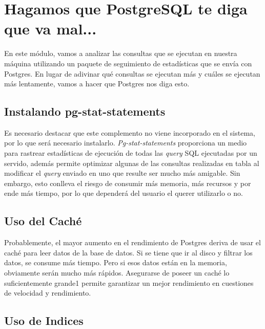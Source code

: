 \documentclass[12pt,conference]{IEEEtran}
\begin{document}
\section{Hagamos que PostgreSQL te diga que va mal...}

En este módulo, vamos a analizar las consultas que se ejecutan en nuestra máquina utilizando un paquete de seguimiento de estadísticas que se envía con Postgres. En lugar de adivinar qué consultas se ejecutan más y cuáles se ejecutan más lentamente, vamos a hacer que Postgres nos diga esto.

\subsection{Instalando pg-stat-statements}
 
Es necesario destacar que este complemento no viene incorporado en el sistema, por lo que será necesario instalarlo. \textit{Pg-stat-statements} proporciona un medio para rastrear estadísticas de ejecución de todas las \textit{query} SQL ejecutadas por un servido, además permite optimizar algunas de las consultas realizadas en tabla al modificar el \textit{query} enviado en uno que resulte ser mucho más amigable. Sin embargo, esto conlleva el riesgo de consumir más memoria, más recursos y por ende más tiempo, por lo que dependerá del usuario el querer utilizarlo o no.

\subsection{Uso del Caché}

Probablemente, el mayor aumento en el rendimiento de Postgres deriva de usar el caché para leer datos de la base de datos. Si se tiene que ir al disco y filtrar los datos, se consume más tiempo. Pero si esos datos están en la memoria, obviamente serán mucho más rápidos. Asegurarse de poseer un caché lo suficientemente grande1 permite garantizar un mejor rendimiento en cuestiones de velocidad y rendimiento.

\subsection{Uso de Indices}
\end{document}

